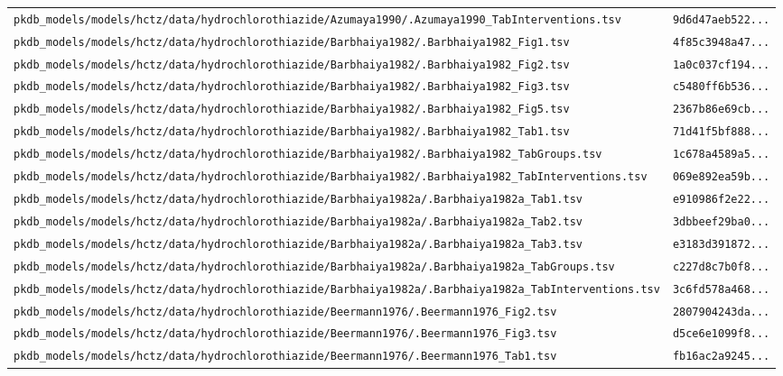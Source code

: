 \documentclass{article}
\begin{document}
\begin{longtable}{ll}
\texttt{pkdb\_models/models/hctz/data/hydrochlorothiazide/Azumaya1990/.Azumaya1990\_TabInterventions.tsv} & \texttt{9d6d47aeb522...} \\
\texttt{pkdb\_models/models/hctz/data/hydrochlorothiazide/Barbhaiya1982/.Barbhaiya1982\_Fig1.tsv} & \texttt{4f85c3948a47...} \\
\texttt{pkdb\_models/models/hctz/data/hydrochlorothiazide/Barbhaiya1982/.Barbhaiya1982\_Fig2.tsv} & \texttt{1a0c037cf194...} \\
\texttt{pkdb\_models/models/hctz/data/hydrochlorothiazide/Barbhaiya1982/.Barbhaiya1982\_Fig3.tsv} & \texttt{c5480ff6b536...} \\
\texttt{pkdb\_models/models/hctz/data/hydrochlorothiazide/Barbhaiya1982/.Barbhaiya1982\_Fig5.tsv} & \texttt{2367b86e69cb...} \\
\texttt{pkdb\_models/models/hctz/data/hydrochlorothiazide/Barbhaiya1982/.Barbhaiya1982\_Tab1.tsv} & \texttt{71d41f5bf888...} \\
\texttt{pkdb\_models/models/hctz/data/hydrochlorothiazide/Barbhaiya1982/.Barbhaiya1982\_TabGroups.tsv} & \texttt{1c678a4589a5...} \\
\texttt{pkdb\_models/models/hctz/data/hydrochlorothiazide/Barbhaiya1982/.Barbhaiya1982\_TabInterventions.tsv} & \texttt{069e892ea59b...} \\
\texttt{pkdb\_models/models/hctz/data/hydrochlorothiazide/Barbhaiya1982a/.Barbhaiya1982a\_Tab1.tsv} & \texttt{e910986f2e22...} \\
\texttt{pkdb\_models/models/hctz/data/hydrochlorothiazide/Barbhaiya1982a/.Barbhaiya1982a\_Tab2.tsv} & \texttt{3dbbeef29ba0...} \\
\texttt{pkdb\_models/models/hctz/data/hydrochlorothiazide/Barbhaiya1982a/.Barbhaiya1982a\_Tab3.tsv} & \texttt{e3183d391872...} \\
\texttt{pkdb\_models/models/hctz/data/hydrochlorothiazide/Barbhaiya1982a/.Barbhaiya1982a\_TabGroups.tsv} & \texttt{c227d8c7b0f8...} \\
\texttt{pkdb\_models/models/hctz/data/hydrochlorothiazide/Barbhaiya1982a/.Barbhaiya1982a\_TabInterventions.tsv} & \texttt{3c6fd578a468...} \\
\texttt{pkdb\_models/models/hctz/data/hydrochlorothiazide/Beermann1976/.Beermann1976\_Fig2.tsv} & \texttt{2807904243da...} \\
\texttt{pkdb\_models/models/hctz/data/hydrochlorothiazide/Beermann1976/.Beermann1976\_Fig3.tsv} & \texttt{d5ce6e1099f8...} \\
\texttt{pkdb\_models/models/hctz/data/hydrochlorothiazide/Beermann1976/.Beermann1976\_Tab1.tsv} & \texttt{fb16ac2a9245...} \\

\end{longtable}
\end{document}
